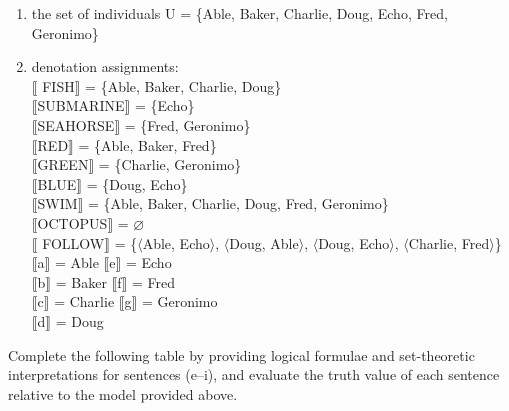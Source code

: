     \z
\begin{enumerate}
\item the set of individuals U = \{Able, Baker, Charlie, Doug, Echo, Fred, Geronimo\}
\item denotation assignments\textsc{:\\
{}$\llbracket$ }\textsc{FISH}$\rrbracket$  = \{Able, Baker, Charlie, Doug\}\\
\textsc{$\llbracket$}SUBMARINE$\rrbracket$  = \{Echo\}\\
\textsc{$\llbracket$}SEAHORSE$\rrbracket$  = \{Fred, Geronimo\}\\
\textsc{$\llbracket$}RED$\rrbracket$  = \{Able, Baker, Fred\}\\
\textsc{$\llbracket$}GREEN$\rrbracket$  = \{Charlie, Geronimo\}\\
\textsc{$\llbracket$}BLUE$\rrbracket$  = \{Doug, Echo\}\\
\textsc{$\llbracket$}SWIM$\rrbracket$  = \{Able, Baker, Charlie, Doug, Fred, Geronimo\}\\
\textsc{$\llbracket$}OCTOPUS$\rrbracket$  = ⌀\\
{}$\llbracket$ FOLLOW$\rrbracket$  = \{$\langle$Able, Echo$\rangle$, $\langle$Doug, Able$\rangle$, $\langle$Doug, Echo$\rangle$, $\langle$Charlie, Fred$\rangle$\}\\
\textsc{$\llbracket$}a$\rrbracket$  = Able  \textsc{$\llbracket$}e$\rrbracket$  = Echo\\
\textsc{$\llbracket$}b$\rrbracket$  = Baker  \textsc{$\llbracket$}f$\rrbracket$  = Fred\\
\textsc{$\llbracket$}c$\rrbracket$  = Charlie  \textsc{$\llbracket$}g$\rrbracket$  = Geronimo\\
\textsc{$\llbracket$}d$\rrbracket$  = Doug
\end{enumerate}
\begin{stylepoints}
\ea%
    \label{ex:key:2}




          Complete the following table by providing logical formulae and set-theoretic interpretations for sentences (e–i), and evaluate the truth value of each sentence relative to the model provided above.
    \z
\end{stylepoints}

